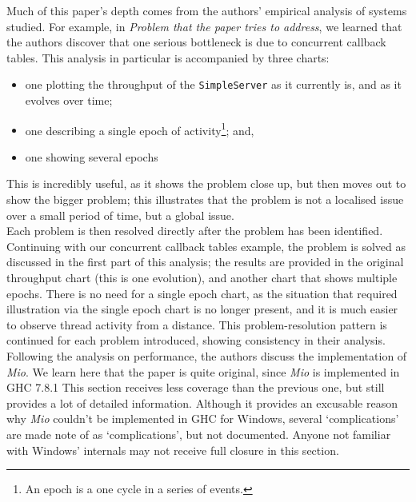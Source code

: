 \documentclass[9pt]{report}
\begin{document}
\noindent
Much of this paper's depth comes from the authors' empirical analysis of systems studied.
For example, in {\it Problem that the paper tries to address}, we learned that the authors discover that one serious bottleneck is due to concurrent callback tables.
This analysis in particular is accompanied by three charts:
\begin{itemize}
\item one plotting the throughput of the \verb/SimpleServer/ as it currently is, and as it evolves over time;
\item one describing a single epoch of activity\footnote{An epoch is a one cycle in a series of events.}; and,
\item one showing several epochs
\end{itemize}

This is incredibly useful, as it shows the problem close up, but then moves out to show the bigger problem; this illustrates that the problem is not a localised issue over a small period of time, but a global issue.\\

Each problem is then resolved directly after the problem has been identified.
Continuing with our concurrent callback tables example, the problem is solved as discussed in the first part of this analysis; the results are provided in the original throughput chart (this is one evolution), and another chart that shows multiple epochs.
There is no need for a single epoch chart, as the situation that required illustration via the single epoch chart is no longer present, and it is much easier to observe thread activity from a distance.
This problem-resolution pattern is continued for each problem introduced, showing consistency in their analysis.\\

\noindent
Following the analysis on performance, the authors discuss the implementation of {\it Mio}.
We learn here that the paper is quite original, since {\it Mio} is implemented in GHC 7.8.1
This section receives less coverage than the previous one, but still provides a lot of detailed information.
Although it provides an excusable reason why {\it Mio} couldn't be implemented in GHC for Windows, several `complications' are made note of as `complications', but not documented.
Anyone not familiar with Windows' internals may not receive full closure in this section.\\
\end{document}
